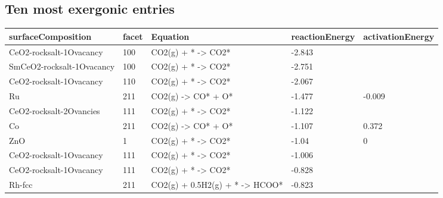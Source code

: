 \documentclass[11pt]{article}
\begin{document}
\subsection{Ten most exergonic entries}
\begin{center}
\small
\begin{tabular}{| p{} | p{} | p{} | p{} | p{} |}
\hline
surfaceComposition & facet & Equation & reactionEnergy & activationEnergy \\
\hline
CeO2-rocksalt-1Ovacancy & 100 & CO2(g) + * -> CO2* & -2.843 &  \\
\hline
SmCeO2-rocksalt-1Ovacancy & 100 & CO2(g) + * -> CO2* & -2.751 &  \\
\hline
CeO2-rocksalt-1Ovacancy & 110 & CO2(g) + * -> CO2* & -2.067 &  \\
\hline
Ru & 211 & CO2(g) -> CO* + O* & -1.477 & -0.009 \\
\hline
CeO2-rocksalt-2Ovancies & 111 & CO2(g) + * -> CO2* & -1.122 &  \\
\hline
Co & 211 & CO2(g) -> CO* + O* & -1.107 & 0.372 \\
\hline
ZnO & 1 & CO2(g) + * -> CO2* & -1.04 & 0 \\
\hline
CeO2-rocksalt-1Ovacancy & 111 & CO2(g) + * -> CO2* & -1.006 &  \\
\hline
CeO2-rocksalt-1Ovacancy & 111 & CO2(g) + * -> CO2* & -0.828 &  \\
\hline
Rh-fcc & 211 & CO2(g) + 0.5H2(g) + * -> HCOO* & -0.823 &  \\
\hline
\end{tabular}
\normalsize
\end{center}
\end{document}
